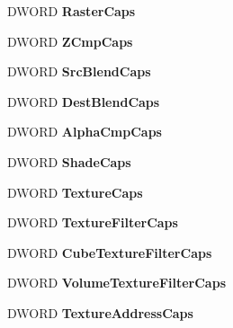 \begin{DoxyCompactItemize}
\item 
\mbox{\label{struct___d3_d_c_a_p_s8_a504cfc7a7341c06d8d44573d2f8e1e1b}} 
D\+W\+O\+RD {\bfseries Raster\+Caps}
\item 
\mbox{\label{struct___d3_d_c_a_p_s8_a62258b3a1ac8adb46d16742321c6eb15}} 
D\+W\+O\+RD {\bfseries Z\+Cmp\+Caps}
\item 
\mbox{\label{struct___d3_d_c_a_p_s8_adb5d3eb8ea0d790f6e517c64a5190144}} 
D\+W\+O\+RD {\bfseries Src\+Blend\+Caps}
\item 
\mbox{\label{struct___d3_d_c_a_p_s8_a14cfe00e64b6edb0645a2ced2a893db4}} 
D\+W\+O\+RD {\bfseries Dest\+Blend\+Caps}
\item 
\mbox{\label{struct___d3_d_c_a_p_s8_ab703f3f2b4bb4478fb2f5e2dcf16ef6b}} 
D\+W\+O\+RD {\bfseries Alpha\+Cmp\+Caps}
\item 
\mbox{\label{struct___d3_d_c_a_p_s8_ac7289a886d093ce9ea00c3f133844b67}} 
D\+W\+O\+RD {\bfseries Shade\+Caps}
\item 
\mbox{\label{struct___d3_d_c_a_p_s8_a9edb24a862146161cb70baf9f9dcb983}} 
D\+W\+O\+RD {\bfseries Texture\+Caps}
\item 
\mbox{\label{struct___d3_d_c_a_p_s8_ab6ad6d88019ce9af0c4c501ffb62d7cc}} 
D\+W\+O\+RD {\bfseries Texture\+Filter\+Caps}
\item 
\mbox{\label{struct___d3_d_c_a_p_s8_acb200288342c60374b9bf1efca6089f8}} 
D\+W\+O\+RD {\bfseries Cube\+Texture\+Filter\+Caps}
\item 
\mbox{\label{struct___d3_d_c_a_p_s8_aec3d5dd47ebe005b92ce89b3a881fa9f}} 
D\+W\+O\+RD {\bfseries Volume\+Texture\+Filter\+Caps}
\item 
\mbox{\label{struct___d3_d_c_a_p_s8_a296f41165a4754039314df480ef97f17}} 
D\+W\+O\+RD {\bfseries Texture\+Address\+Caps}
\item 

\end{DoxyCompactItemize}
